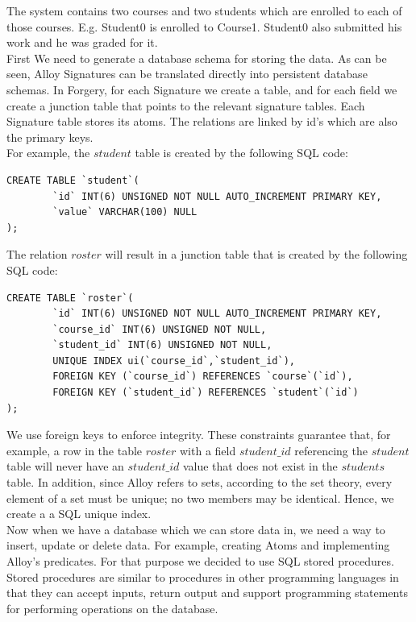 \documentclass[oneside]{book}
\begin{document}
The system contains two courses and two students which are enrolled to each of those courses. E.g. Student0 is enrolled to Course1. Student0 also submitted his work and he was graded for it.\\

First We need to generate a database schema for storing the data. As can be seen, Alloy Signatures can be translated directly into persistent database schemas. In Forgery, for each Signature we create a table, and for each field we create a junction table that points to the relevant signature tables. Each Signature table stores its atoms. The relations are linked by id's which are also the primary keys.\\

For example, the $student$ table is created by the following SQL code:

\begin{lstlisting}
CREATE TABLE `student`(
        `id` INT(6) UNSIGNED NOT NULL AUTO_INCREMENT PRIMARY KEY,
        `value` VARCHAR(100) NULL
);
\end{lstlisting}

The relation $roster$ will result in a junction table that is created by the following SQL code:

\begin{lstlisting}
CREATE TABLE `roster`(
        `id` INT(6) UNSIGNED NOT NULL AUTO_INCREMENT PRIMARY KEY,
        `course_id` INT(6) UNSIGNED NOT NULL,
        `student_id` INT(6) UNSIGNED NOT NULL,
        UNIQUE INDEX ui(`course_id`,`student_id`),
        FOREIGN KEY (`course_id`) REFERENCES `course`(`id`),
        FOREIGN KEY (`student_id`) REFERENCES `student`(`id`)
);
\end{lstlisting}

We use foreign keys to enforce integrity. These constraints guarantee that, for example, a row in the table $roster$ with a field $student\_id$ referencing the $student$ table will never have an $student\_id$ value that does not exist in the $students$ table. In addition, since Alloy refers to sets, according to the set theory, every element of a set must be unique; no two members may be identical. Hence, we create a a SQL unique index.\\

Now when we have a database which we can store data in, we need a way to insert, update or delete data. For example, creating Atoms and implementing Alloy's predicates. For that purpose we decided to use SQL stored procedures. Stored procedures are similar to procedures in other programming languages in that they can accept inputs, return output and support programming statements for performing operations on the database.\\
\end{document}
